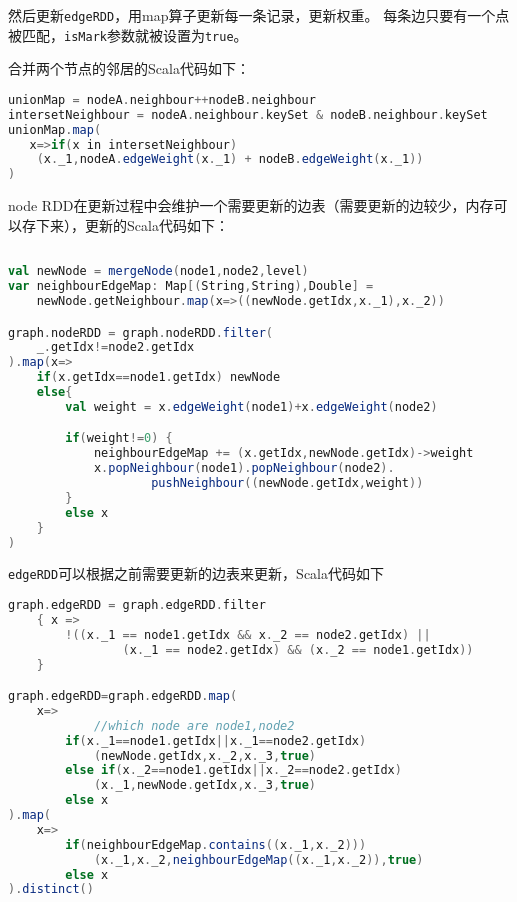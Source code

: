 然后更新\texttt{edgeRDD}，用map算子更新每一条记录，更新权重。
每条边只要有一个点被匹配，\texttt{isMark}参数就被设置为\texttt{true}。

合并两个节点的邻居的Scala代码如下：

\begin{lstlisting}[language=Scala]
unionMap = nodeA.neighbour++nodeB.neighbour
intersetNeighbour = nodeA.neighbour.keySet & nodeB.neighbour.keySet
unionMap.map(
   x=>if(x in intersetNeighbour)
    (x._1,nodeA.edgeWeight(x._1) + nodeB.edgeWeight(x._1))
)
\end{lstlisting}

node RDD在更新过程中会维护一个需要更新的边表（需要更新的边较少，内存可以存下来），更新的Scala代码如下：

\begin{lstlisting}[language=Scala]
    
val newNode = mergeNode(node1,node2,level)
var neighbourEdgeMap: Map[(String,String),Double] =
    newNode.getNeighbour.map(x=>((newNode.getIdx,x._1),x._2))

graph.nodeRDD = graph.nodeRDD.filter(
    _.getIdx!=node2.getIdx
).map(x=>
    if(x.getIdx==node1.getIdx) newNode
    else{
        val weight = x.edgeWeight(node1)+x.edgeWeight(node2)

        if(weight!=0) {
            neighbourEdgeMap += (x.getIdx,newNode.getIdx)->weight
            x.popNeighbour(node1).popNeighbour(node2).
                    pushNeighbour((newNode.getIdx,weight))
        }
        else x
    }
)
\end{lstlisting}

\texttt{edgeRDD}可以根据之前需要更新的边表来更新，Scala代码如下

\begin{lstlisting}[language=Scala]
graph.edgeRDD = graph.edgeRDD.filter
    { x =>
        !((x._1 == node1.getIdx && x._2 == node2.getIdx) ||
                (x._1 == node2.getIdx) && (x._2 == node1.getIdx))
    }

graph.edgeRDD=graph.edgeRDD.map(
    x=>
            //which node are node1,node2
        if(x._1==node1.getIdx||x._1==node2.getIdx)
            (newNode.getIdx,x._2,x._3,true)
        else if(x._2==node1.getIdx||x._2==node2.getIdx)
            (x._1,newNode.getIdx,x._3,true)
        else x
).map(
    x=>
        if(neighbourEdgeMap.contains((x._1,x._2)))
            (x._1,x._2,neighbourEdgeMap((x._1,x._2)),true)
        else x
).distinct()

\end{lstlisting}

